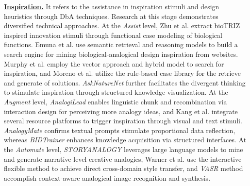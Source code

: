 \textbf{\underline{Inspiration.}} It refers to the assistance in inspiration stimuli and design heuristics through DbA techniques. Research at this stage demonstrates diversified technical approaches. At the \textit{Assist} level, Zhu et al. extract bioTRIZ inspired innovation stimuli through functional case modeling of biological functions\cite{zhu2023design}. Emuna et al. use semantic retrieval and reasoning models to build a search engine for mining biological-analogical design inspiration from websites\cite{emuna2024imitation}. Murphy et al. employ the vector approach and hybrid model to search for inspiration\cite{murphy2014function}, and Moreno et al. utilize the rule-based case library for the retrieve and generate of solutions\cite{moreno2014fundamental}. \textit{AskNatureNet} further facilitates the divergent thinking to stimulate inspiration through structured knowledge visualization\cite{chen2024asknaturenet}. At the \textit{Augment} level, \textit{AnalogiLead} enables linguistic chunk and recombination via interaction design for perceiving more analogy ideas\cite{srinivasan2024improving}, and Kang et al. integrate several resource platforms to trigger inspiration through visual and text stimuli\cite{kang2025biospark}. \textit{AnalogyMate} confirms textual prompts stimulate proportional data reflection\cite{chen2024beyond}, whereas \textit{BIDTrainer} enhances knowledge acquisition via structured interfaces\cite{chen2024BIDTrain}. At the \textit{Automate} level, \textit{STORYANALOGY} leverages large language models to mine and generate narrative-level creative analogies\cite{jiayang2023storyanalogy}, Warner et al. use the interactive flexible method to achieve direct cross-domain style transfer\cite{warner2023interactive}, and \textit{VASR} method accomplish context-aware analogical image recognition and synthesis\cite{bitton2023vasr}.



